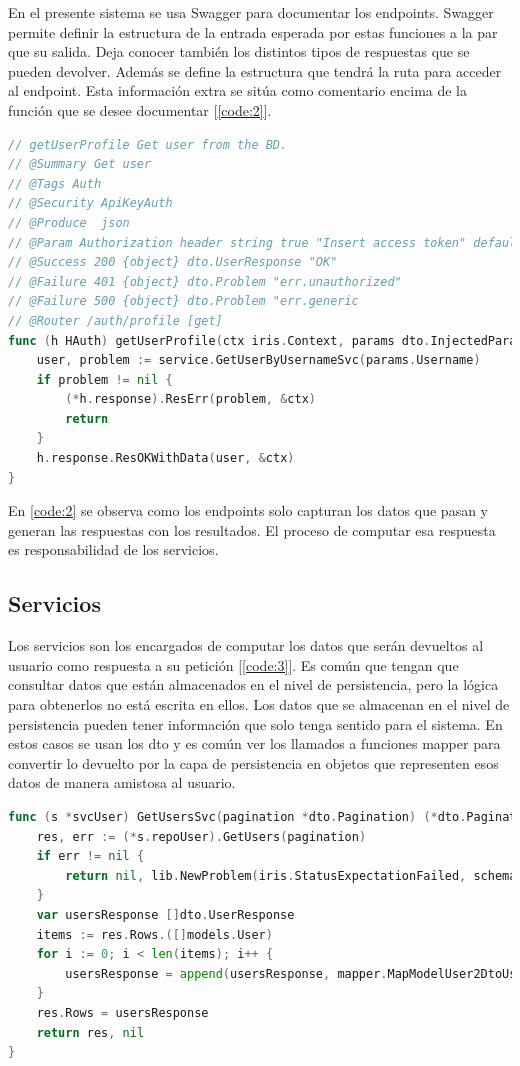 En el presente sistema se usa Swagger para documentar los endpoints. Swagger permite definir la estructura de la entrada esperada por estas funciones a la par que su salida. Deja conocer también los distintos tipos de respuestas que se pueden devolver. Además se define la estructura que tendrá la ruta para acceder al endpoint. Esta información extra se sitúa como comentario encima de la función que se desee documentar [\ref{code:2}].
\begin{lstlisting}[language=Go,caption={Endpoint para obtener los datos del usuario actualmente autenticado}, label={code:2}]
// getUserProfile Get user from the BD.
// @Summary Get user
// @Tags Auth
// @Security ApiKeyAuth
// @Produce  json
// @Param Authorization header string true "Insert access token" default(Bearer <Add access token here>)
// @Success 200 {object} dto.UserResponse "OK"
// @Failure 401 {object} dto.Problem "err.unauthorized"
// @Failure 500 {object} dto.Problem "err.generic
// @Router /auth/profile [get]
func (h HAuth) getUserProfile(ctx iris.Context, params dto.InjectedParam, service service.ISvcUser) {
	user, problem := service.GetUserByUsernameSvc(params.Username)
	if problem != nil {
		(*h.response).ResErr(problem, &ctx)
		return
	}
	h.response.ResOKWithData(user, &ctx)
}
\end{lstlisting}

En \ref{code:2} se observa como los endpoints solo capturan los datos que pasan y generan las respuestas con los resultados. El proceso de computar esa respuesta es responsabilidad de los servicios.

\subsection{Servicios}
Los servicios son los encargados de computar los datos que serán devueltos al usuario como respuesta a su petición [\ref{code:3}]. Es común que tengan que consultar datos que están almacenados en el nivel de persistencia, pero la lógica para obtenerlos no está escrita en ellos. Los datos que se almacenan en el nivel de persistencia pueden tener información que solo tenga sentido para el sistema. En estos casos se usan los dto y es común ver los llamados a funciones mapper para convertir lo devuelto por la capa de persistencia en objetos que representen esos datos de manera amistosa al usuario.

\begin{lstlisting}[language=Go,caption={Servicio para obtener los usuarios de la base de datos}, label={code:3}]
func (s *svcUser) GetUsersSvc(pagination *dto.Pagination) (*dto.Pagination, *dto.Problem) {
	res, err := (*s.repoUser).GetUsers(pagination)
	if err != nil {
		return nil, lib.NewProblem(iris.StatusExpectationFailed, schema.ErrBuntdb, err.Error())
	}
	var usersResponse []dto.UserResponse
	items := res.Rows.([]models.User)
	for i := 0; i < len(items); i++ {
		usersResponse = append(usersResponse, mapper.MapModelUser2DtoUserResponse(items[i]))
	}
	res.Rows = usersResponse
	return res, nil
}
\end{lstlisting}

